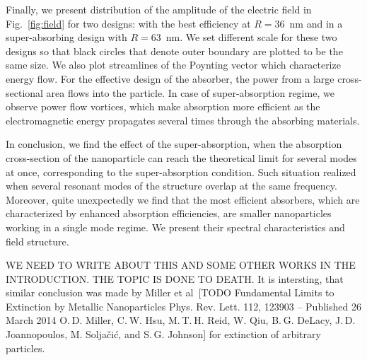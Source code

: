\documentclass[aps,prl,twocolumn,showpacs,superscriptaddress,groupedaddress]{revtex4-1}
\begin{document}
\begin{figure}
\end{figure}
%
Finally, we present distribution of the amplitude of the electric
field in Fig.~\ref{fig:field} for two designs: with the best
efficiency at $R=36$~nm and in a super-absorbing design with
$R=63$~nm.  We set different scale for these two designs so that black
circles that denote outer boundary are plotted to be the same size.
We also plot streamlines of the Poynting vector which characterize
energy flow. For the effective design of the absorber, the power from
a large cross-sectional area flows into the particle.  In case of
super-absorption regime, we observe power flow vortices, which make
absorption more efficient as the electromagnetic energy propagates
several times through the absorbing materials.


In conclusion, we find the effect of the super-absorption, when the
absorption cross-section of the nanoparticle can reach the
theoretical limit for several modes at once, corresponding to  the super-absorption condition. Such situation realized when  several resonant modes of the structure overlap at the
same frequency. Moreover, quite unexpectedly we find that the most efficient
absorbers, which are characterized by enhanced absorption efficiencies, are smaller nanoparticles working in a single mode
regime. We present their spectral characteristics and field structure.


WE NEED TO WRITE ABOUT THIS AND SOME OTHER WORKS IN THE
INTRODUCTION. THE TOPIC IS DONE TO DEATH. It is intersting, that
similar conclusion was made by Miller et al~[TODO Fundamental Limits
to Extinction by Metallic Nanoparticles Phys. Rev. Lett. 112, 123903 –
Published 26 March 2014 O. D. Miller, C. W. Hsu, M. T. H. Reid,
W. Qiu, B. G. DeLacy, J. D. Joannopoulos, M. Soljačić, and
S. G. Johnson] for extinction of arbitrary particles.



\end{document}
